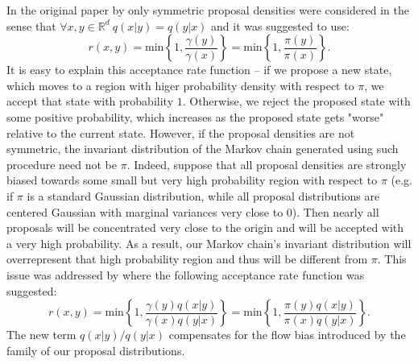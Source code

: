 \documentclass[report.tex]{subfiles}
\begin{document}
In the original paper by \citet{metropolis1953equation}
only symmetric proposal densities were considered in the sense that
$\forall x,y \in \mathbb{R}^{d}\ q(x \vert y) = q(y \vert x)$
and it was suggested to use:
\begin{equation}
  \label{metropolis-acceptance-rate}
  r(x, y)
  = \text{min}\left\{1, \frac{\gamma(y)}{\gamma(x)} \right\}
  = \text{min}\left\{1, \frac{\pi(y)}{\pi(x)} \right\}.
\end{equation}
It is easy to explain this acceptance rate function --
if we propose a new state, which moves
to a region with higer probability density with respect to $\pi$, we accept
that state with probability $1$. Otherwise, we reject the proposed state with
some positive probability, which increases as the proposed state gets "worse"
relative to the current state.
However, if the proposal densities are not symmetric, the invariant distribution
of the Markov chain generated using such procedure need not be $\pi$.
Indeed, suppose that all proposal densities
are strongly biased towards some small but very high probability
region with respect to $\pi$ (e.g. if $\pi$ is a standard Gaussian
distribution, while all proposal distributions are centered Gaussian with
marginal variances very close to $0$).
Then nearly all proposals will be concentrated very close to the origin and will be
accepted with a very high probability.
As a result, our Markov chain's invariant distribution will overrepresent that
high probability region and thus will be different from $\pi$.
This issue was addressed by \citet{hastings1970monte} where the following
acceptance rate function was suggested:
\begin{equation}
  \label{hastings-acceptance-rate}
  r(x, y)
  = \text{min}\left\{1, \frac{\gamma(y)q(x \vert y)}{\gamma(x)q(y \vert x)} \right\}
  = \text{min}\left\{1, \frac{\pi(y)q(x \vert y)}{\pi(x)q(y \vert x)} \right\}.
\end{equation}
The new term $q(x|y)/q(y|x)$ compensates for the flow bias
introduced by the family of our proposal distributions.
\end{document}
